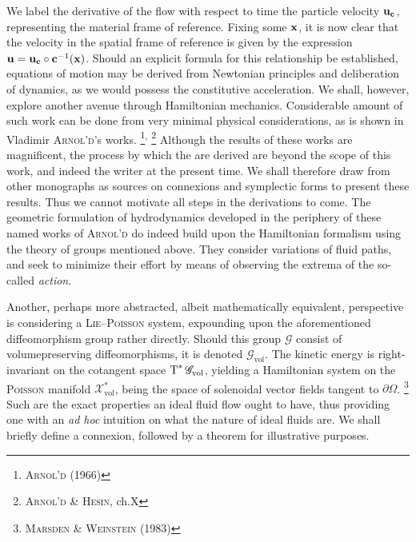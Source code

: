 We label the derivative of the flow with respect to time the particle velocity $\mathbf{u}_{\mathbf{c}}$, representing the material frame of reference.
Fixing some $\mathbf{x}$, it is now clear that the velocity in the spatial frame of reference is given by the expression $\mathbf{u} = \mathbf{u}_{\mathbf{c}} \circ \mathbf{c}^{-1}(\mathbf{x})$.
Should an explicit formula for this relationship be established, equations of motion may be derived from Newtonian principles and deliberation of dynamics, as we would possess the constitutive acceleration.
We shall, however, explore another avenue through Hamiltonian mechanics.
Considerable amount of such work can be done from very minimal physical considerations, as is shown in Vladimir \textsc{Arnol'd}’s works.%
\footnote{%
        \cite{arnold1966geometrie} \textsc{Arnol'd} (1966)
}\textsuperscript{,}%
\footnote{%
        \cite{arnold2011topological} \textsc{Arnol'd} \& \textsc{Hesin}, ch.X
}
Although the results of these works are magnificent, the process by which the are derived are beyond the scope of this work, and indeed the writer at the present time.
We shall therefore draw from other monographs as sources on connexions and symplectic forms to present these results.
Thus we cannot motivate all steps in the derivations to come.
The geometric formulation of hydrodynamics developed in the periphery of these named works of \textsc{Arnol'd} do indeed build upon the Hamiltonian formalism using the theory of groups mentioned above.
They consider variations of fluid paths, and seek to minimize their effort by means of observing the extrema of the so-called \emph{action}.

Another, perhaps more abstracted, albeit mathematically equivalent, perspective is considering a \textsc{Lie}--\textsc{Poisson} system, expounding upon the aforementioned diffeomorphism group rather directly.
Should this group $\mathscr{G}$ consist of volumepreserving diffeomorphisms, it is denoted $\mathscr{G}_{\mathrm{vol}}$.
The kinetic energy is right-invariant on the cotangent space $\operatorname{T}^{\ast}\mathscr{G}_{\mathrm{vol}}$, yielding a Hamiltonian system on the \textsc{Poisson} manifold $\mathscr{X}^{\ast}_{\mathrm{vol}}$, being the space of solenoidal vector fields tangent to $\partial\Omega$.%
\footnote{%
        \cite{marsden1983coadjoint} \textsc{Marsden} \& \textsc{Weinstein} (1983)
}
Such are the exact properties an ideal fluid flow ought to have, thus providing one with an \emph{ad hoc} intuition on what the nature of ideal fluids are.
We shall briefly define a connexion, followed by a theorem for illustrative purposes.

